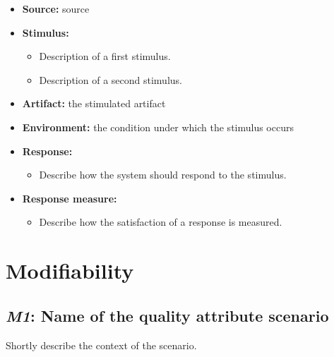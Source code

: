 \documentclass[english]{sareport}
\begin{document}
\begin{itemize}
    \item \textbf{Source:} source
    \item \textbf{Stimulus:}
        \begin{itemize}
            \item Description of a first stimulus.
            \item Description of a second stimulus.
        \end{itemize}

    \item \textbf{Artifact:} the stimulated artifact
    \item \textbf{Environment:} the condition under which the stimulus occurs
    \item \textbf{Response:}
        \begin{itemize}
            \item Describe how the system should respond to the stimulus.
        \end{itemize}

    \item \textbf{Response measure:}
        \begin{itemize}
            \item Describe how the satisfaction of a response is measured.
        \end{itemize}
\end{itemize}

\section{Modifiability}
\subsection{\emph{M1}: Name of the quality attribute scenario}
Shortly describe the context of the scenario.
\end{document}

